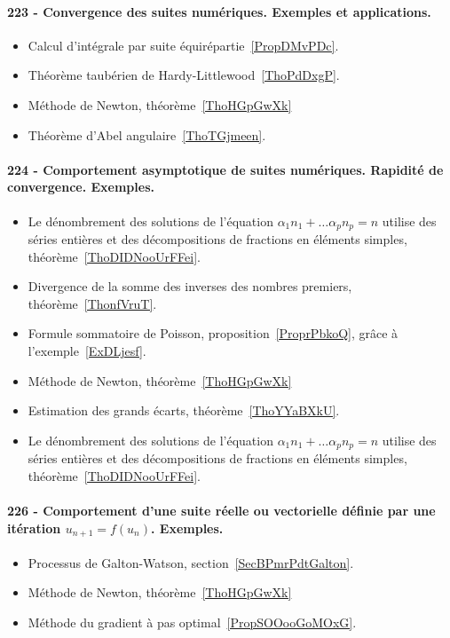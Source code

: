 \paragraph{223 - Convergence des suites numériques. Exemples et applications.}
\begin{itemize}
    \item Calcul d'intégrale par suite équirépartie~\ref{PropDMvPDc}.
    \item Théorème taubérien de Hardy-Littlewood~\ref{ThoPdDxgP}.
    \item Méthode de Newton, théorème~\ref{ThoHGpGwXk}
    \item Théorème d'Abel angulaire~\ref{ThoTGjmeen}.
\end{itemize}
\paragraph{224 - Comportement asymptotique de suites numériques. Rapidité de convergence. Exemples.}
\begin{itemize}
    \item Le dénombrement des solutions de l'équation \( \alpha_1 n_1+\ldots \alpha_pn_p=n\) utilise des séries entières et des décompositions de fractions en éléments simples, théorème~\ref{ThoDIDNooUrFFei}.
    \item Divergence de la somme des inverses des nombres premiers, théorème~\ref{ThonfVruT}.
    \item Formule sommatoire de Poisson, proposition~\ref{ProprPbkoQ}, grâce à l'exemple~\ref{ExDLjesf}.
    \item Méthode de Newton, théorème~\ref{ThoHGpGwXk}
    \item Estimation des grands écarts, théorème~\ref{ThoYYaBXkU}.
    \item Le dénombrement des solutions de l'équation \( \alpha_1 n_1+\ldots \alpha_pn_p=n\) utilise des séries entières et des décompositions de fractions en éléments simples, théorème~\ref{ThoDIDNooUrFFei}.
\end{itemize}
\paragraph{226 - Comportement d’une suite réelle ou vectorielle définie par une itération \( u_{n+1}=f(u_n)\). Exemples.}
\begin{itemize}
    \item Processus de Galton-Watson, section~\ref{SecBPmrPdtGalton}.
    \item Méthode de Newton, théorème~\ref{ThoHGpGwXk}
    \item Méthode du gradient à pas optimal~\ref{PropSOOooGoMOxG}.
\end{itemize}
